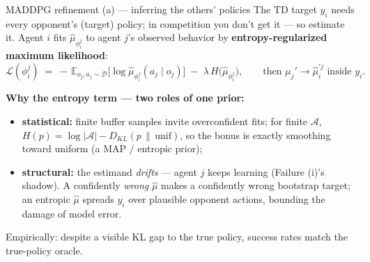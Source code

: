 \documentclass[10pt, aspectratio=169]{beamer}
\begin{document}
\begin{frame}{MADDPG refinement (a) --- inferring the others' policies}
The TD target $y_i$ needs every opponent's (target) policy; in competition you don't get it --- so \alert{estimate it}. Agent $i$ fits $\hat\mu_{\phi_i^j}$ to agent $j$'s observed behavior by \textbf{entropy-regularized maximum likelihood}:
\[
\mathcal{L}(\phi_i^j) \;=\; -\,\mathbb{E}_{o_j, a_j \sim \mathcal{D}}\big[ \log \hat\mu_{\phi_i^j}(a_j \mid o_j) \big] \;-\; \lambda\, H\big(\hat\mu_{\phi_i^j}\big),
\qquad \text{then } \mu_j' \to \hat\mu_i^{\prime j} \text{ inside } y_i.
\]
\smallskip

\pause
\textbf{Why the entropy term --- two roles of one prior:}
\begin{itemize}\setlength\itemsep{2pt}
\item \textbf{statistical:} finite buffer samples invite overconfident fits; for finite $\mathcal{A}$, $H(p) = \log|\mathcal{A}| - D_{KL}(p \,\|\, \mathrm{unif})$, so the bonus is exactly \alert{smoothing toward uniform} (a MAP / entropic prior);
\item \textbf{structural:} the estimand \emph{drifts} --- agent $j$ keeps learning (Failure (i)'s shadow). A confidently \emph{wrong} $\hat\mu$ makes a confidently wrong bootstrap target; an entropic $\hat\mu$ spreads $y_i$ over plausible opponent actions, \alert{bounding the damage of model error}.
\end{itemize}
\smallskip
{\footnotesize Empirically: despite a visible KL gap to the true policy, success rates match the true-policy oracle.}
\end{frame}
\end{document}
